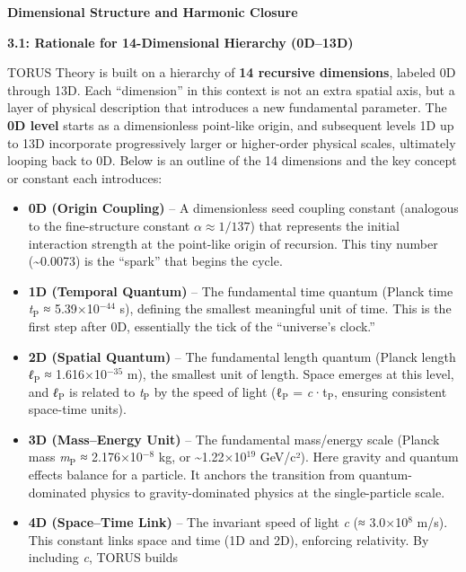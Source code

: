 \documentclass[]{article}
\date{}
\newcommand{\subscript}[1]{\ensuremath{_{\mathrm{#1}}}}
\newcommand{\superscript}[1]{\ensuremath{^{\mathrm{#1}}}}
\begin{document}
\textbf{Dimensional Structure and Harmonic Closure}

\textbf{3.1: Rationale for 14-Dimensional Hierarchy (0D--13D)}

TORUS Theory is built on a hierarchy of \textbf{14 recursive
dimensions}, labeled 0D through 13D. Each ``dimension'' in this context
is not an extra spatial axis, but a layer of physical description that
introduces a new fundamental parameter. The \textbf{0D level} starts as
a dimensionless point-like origin, and subsequent levels 1D up to 13D
incorporate progressively larger or higher-order physical scales,
ultimately looping back to 0D. Below is an outline of the 14 dimensions
and the key concept or constant each introduces:

\begin{itemize}
\item
  \textbf{0D (Origin Coupling)} -- A dimensionless seed coupling
  constant (analogous to the fine-structure constant $\alpha \approx 1/137$) that
  represents the initial interaction strength at the point-like origin
  of recursion​. This tiny number (\textasciitilde{}0.0073) is the
  ``spark'' that begins the cycle.
\item
  \textbf{1D (Temporal Quantum)} -- The fundamental time quantum (Planck
  time
  \emph{t\subscript{P}} ≈
  5.39×10\superscript{−44} s), defining the smallest meaningful unit of time. This
  is the first step after 0D, essentially the tick of the ``universe's
  clock.''
\item
  \textbf{2D (Spatial Quantum)} -- The fundamental length quantum
  (Planck length
  \emph{ℓ\subscript{P}} ≈
  1.616×10\superscript{−35} m), the smallest unit of length​. Space emerges at
  this level, and
  \emph{ℓ\subscript{P}} is
  related to
  \emph{t\subscript{P}} by
  the speed of light
  (ℓ\subscript{P} =
  \emph{c}·t\subscript{P},
  ensuring consistent space-time units).
\item
  \textbf{3D (Mass--Energy Unit)} -- The fundamental mass/energy scale
  (Planck mass
  \emph{m\subscript{P}} ≈
  2.176×10\superscript{−8} kg, or \textasciitilde{}1.22×10\superscript{19} GeV/c²)​. Here
  gravity and quantum effects balance for a particle. It anchors the
  transition from quantum-dominated physics to gravity-dominated physics
  at the single-particle scale.
\item
  \textbf{4D (Space--Time Link)} -- The invariant speed of light
  \emph{c} (≈ 3.0×10\superscript{8} m/s)​. This constant links space and time (1D
  and 2D), enforcing relativity. By including \emph{c}, TORUS builds

\end{itemize}
\end{document}
